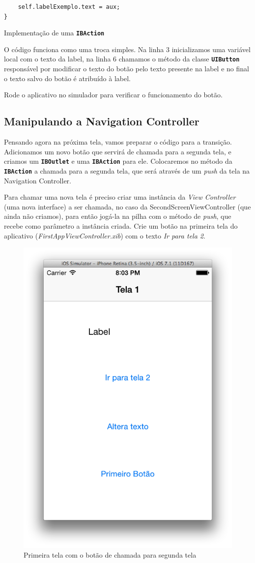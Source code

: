 \documentclass[a4paper,12pt,brazil,doubleside]{book}
\begin{document}
\begin{singlespace}
\begin{listing}[H]
\begin{verbatim}
    self.labelExemplo.text = aux;
}
\end{verbatim}
\caption{Implementação de uma \texttt{\textbf{IBAction}}}
\end{listing}


O código funciona como uma troca simples. Na linha 3 inicializamos uma variável local com o texto da label, na linha 6 chamamos o método da classe \texttt{\textbf{UIButton}} responsável por modificar o texto do botão pelo texto presente na label e no final o texto salvo do botão é atribuído à label.

Rode o aplicativo no simulador para verificar o funcionamento do botão.

\bigskip

\subsection{Manipulando a Navigation Controller}


Pensando agora na próxima tela, vamos preparar o código para a transição. Adicionamos um novo botão que servirá de chamada para a segunda tela, e criamos um \texttt{\textbf{IBOutlet}} e uma \texttt{\textbf{IBAction}} para ele. Colocaremos no método da \texttt{\textbf{IBAction}} a chamada para a segunda tela, que será através de um \emph{push} da tela na Navigation Controller.


Para chamar uma nova tela é preciso criar uma instância da \emph{View Controller} (uma nova interface) a ser chamada, no caso da SecondScreenViewController (que ainda não criamos), para então jogá-la na pilha com o método de \emph{push}, que recebe como parâmetro a instância criada. Crie um botão na primeira tela do aplicativo (\emph{FirstAppViewController.xib}) com o texto \emph{Ir para tela 2}.


\begin{figure}[H]
  \centering
  \includegraphics[width=.55\textwidth]{figuras/3/tela_novo_projeto_31.png}
  \caption{Primeira tela com o botão de chamada para segunda tela}
  \label{fig:a}
\end{figure}



\end{singlespace}
\end{document}
